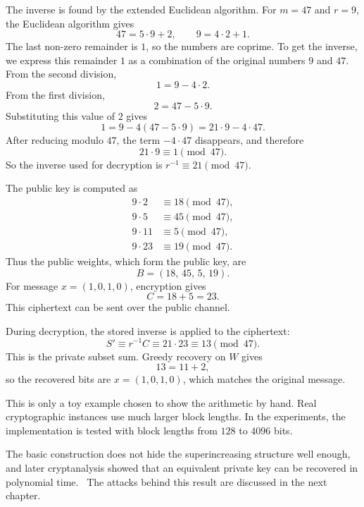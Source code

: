 The inverse is found by the extended Euclidean algorithm. For $m=47$ and
$r=9$, the Euclidean algorithm gives
\[
    47 = 5\cdot 9 + 2,\qquad 9 = 4\cdot 2 + 1.
\]
The last non-zero remainder is $1$, so the numbers are coprime. To get the
inverse, we express this remainder $1$ as a combination of the original numbers
$9$ and $47$. From the
second division,
\[
    1=9-4\cdot2.
\]
From the first division,
\[
    2=47-5\cdot9.
\]
Substituting this value of $2$ gives
\[
    1 = 9 - 4(47 - 5\cdot 9) = 21\cdot 9 - 4\cdot 47.
\]
After reducing modulo $47$, the term $-4\cdot47$ disappears, and therefore
\[
    21\cdot 9 \equiv 1 \pmod{47}.
\]
So the inverse used for decryption is $r^{-1}\equiv 21 \pmod{47}$.

The public key is computed as
\[
    \begin{aligned}
        9\cdot 2 &\equiv 18 \pmod{47},\\
        9\cdot 5 &\equiv 45 \pmod{47},\\
        9\cdot 11 &\equiv 5 \pmod{47},\\
        9\cdot 23 &\equiv 19 \pmod{47}.
    \end{aligned}
\]
Thus the public weights, which form the public key, are
\[
    B=(18,\,45,\,5,\,19).
\]
For message $x=(1,0,1,0)$, encryption gives
\[
    C=18+5=23.
\]
This ciphertext can be sent over the public channel.

During decryption, the stored inverse is applied to the ciphertext:
\[
    S' \equiv r^{-1}C \equiv 21\cdot 23 \equiv 13 \pmod{47}.
\]
This is the private subset sum. Greedy recovery on $W$ gives
\[
    13=11+2,
\]
so the recovered bits are $x=(1,0,1,0)$, which matches the original message.

This is only a toy example chosen to show the arithmetic by hand. Real
cryptographic instances use much larger block lengths. In the experiments, the
implementation is tested with block lengths from $128$ to $4096$ bits.

The basic construction does not hide the superincreasing structure well enough,
and later cryptanalysis showed that an equivalent private key can be recovered
in polynomial time.~\cite{Shamir1982} The attacks behind this result are
discussed in the next chapter.
